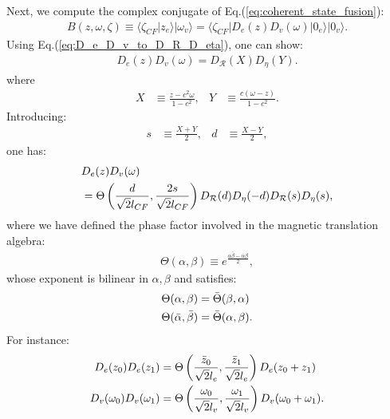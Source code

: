 \begin{subappendices}
    Next, we compute the complex conjugate of Eq.(\ref{eq:coherent_state_fusion}):
    \begin{align}
        B(z,\omega,\zeta)\equiv\langle\zeta_{CF}|z_e\rangle|\omega_v\rangle=\langle\zeta_{CF}|D_{e}(z) D_{v}(\omega)|0_e\rangle|0_v\rangle.\label{eq:B_definition}
    \end{align}
    Using Eq.(\ref{eq:D_e_D_v_to_D_R_D_eta}), one can show:
    \begin{align}
        D_{e}(z) D_{v}(\omega)=D_{\mathcal R}(X)D_\eta(Y).
    \end{align}
    where
    \begin{align}
        X & \equiv\frac{z-c^2\omega}{1-c^2}, & Y & \equiv\frac{c(\omega-z)}{1-c^2}.
    \end{align}
    Introducing:
    \begin{align}
        s & \equiv\frac{X+Y}{2}, & d & \equiv\frac{X-Y}{2},
    \end{align}
    one has:
    \begin{align}
         & D_{e}(z) D_{v}(\omega)\notag                                                                                                                        \\
         & =\Theta\left(\frac{d}{\sqrt{2}l_{CF}},\frac{2s}{\sqrt{2}l_{CF}}\right) D_{\mathcal R}(d)D_{\eta}(-d)D_{\mathcal R}(s)D_{\eta}(s),\label{eq:D_e_D_v}
    \end{align}
    where we have defined the phase factor involved in the magnetic translation algebra:
    \begin{align}
        \Theta(\alpha,\beta)\equiv e^{\frac{\alpha\bar\beta-\bar\alpha\beta}{2}},
    \end{align}
    whose exponent is bilinear in $\alpha,\beta$ and satisfies:
    \begin{align}
        \Theta(\alpha,\beta)          & =\bar \Theta(\beta,\alpha)\notag \\
        \Theta(\bar \alpha,\bar\beta) & =\bar \Theta(\alpha,\beta).
    \end{align}
    For instance:
    \begin{align}
        D_e(z_0)D_e(z_1)           & =\Theta\left(\frac{\bar z_0}{\sqrt 2l_e},\frac{\bar z_1}{\sqrt 2l_e}\right)D_e(z_0+z_1)\notag      \\
        D_v(\omega_0)D_v(\omega_1) & =\Theta\left(\frac{\omega_0}{\sqrt 2l_v},\frac{\omega_1}{\sqrt 2l_v}\right)D_v(\omega_0+\omega_1).
    \end{align}


\end{subappendices}
